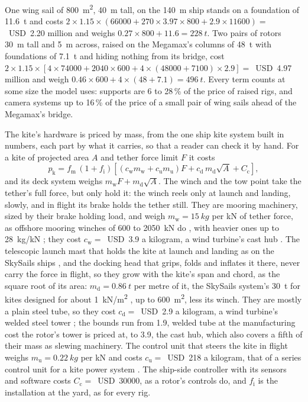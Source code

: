 One wing sail of \SI{800}{m^2}, \SI{40}{m} tall, on the \SI{140}{m} ship stands on a foundation of \SI{11.6}{t} and costs $2\times1.15\times(\num{66000} + 270\times3.97\times800 + 2.9\times\num{11600}) =$~USD~2.20 million and weighs $0.27\times800 + 11.6=\SI{228}{t}$. Two pairs of rotors \SI{30}{m} tall and \SI{5}{m} across, raised on the Megamax's columns of \SI{48}{t} with foundations of \SI{7.1}{t} and hiding nothing from its bridge, cost $2\times1.15\times[4\times\num{74000} + 2040\times600 + 4\times(\num{48000} + \num{7100})\times2.9] =$~USD~4.97 million and weigh $0.46\times600 + 4\times(48 + 7.1) = \SI{496}{t}$. Every term counts at some size the model uses: supports are 6 to 28\,\% of the price of raised rigs, and camera systems up to 16\,\% of the price of a small pair of wing sails ahead of the Megamax's bridge.

The kite's hardware is priced by mass, from the one ship kite system built in numbers, each part by what it carries, so that a reader can check it by hand. For a kite of projected area $A$ and tether force limit $F$ it costs
\begin{equation}
p_\mathrm{k} = f_\mathrm{m}\,(1+f_\mathrm{i})\left[\left(c_\mathrm{w} m_\mathrm{w} + c_\mathrm{u} m_\mathrm{u}\right)F + c_\mathrm{d}\, m_\mathrm{d}\sqrt{A} + C_\mathrm{c}\right],
\label{eq:kite_price}
\end{equation}
and its deck system weighs $m_\mathrm{w}F + m_\mathrm{d}\sqrt{A}$. The winch and the tow point take the tether's full force, but only hold it: the winch reels only at launch and landing, slowly, and in flight its brake holds the tether still. They are mooring machinery, sized by their brake holding load, and weigh $m_\mathrm{w}=\SI{15}{kg}$ per kN of tether force, as offshore mooring winches of 600 to \SI{2050}{kN} do \citep{broehl2018offshore}, with heavier ones up to \SI{28}{kg/kN} \citep{mordec_deck}; they cost $c_\mathrm{w}=$~USD~3.9 a kilogram, a wind turbine's cast hub \citep{wisdem_csm}. The telescopic launch mast that holds the kite at launch and landing as on the SkySails ships \citep{wrage2018}, and the docking head that grips, folds and inflates it there, never carry the force in flight, so they grow with the kite's span and chord, as the square root of its area: $m_\mathrm{d}=\SI{0.86}{t}$ per metre of it, the SkySails system's \SI{30}{t} \citep[Annex A.4]{cedelft2016} for kites designed for about \SI{1}{kN/m^2} \citep{paulig2013}, up to \SI{600}{m^2}, less its winch. They are mostly a plain steel tube, so they cost $c_\mathrm{d}=$~USD~2.9 a kilogram, a wind turbine's welded steel tower \citep{wisdem_csm}; the bounds run from 1.9, welded tube at the manufacturing cost the rotor's tower is priced at, to 3.9, the cast hub, which also covers a fifth of their mass as slewing machinery. The control unit that steers the kite in flight weighs $m_\mathrm{u}=\SI{0.22}{kg}$ per kN \citep{paulig2013} and costs $c_\mathrm{u}=$~USD~218 a kilogram, that of a series control unit for a kite power system \citep{faggiani2018}. The ship-side controller with its sensors and software costs $C_\mathrm{c}=$~USD~\num{30000}, as a rotor's controls do, and $f_\mathrm{i}$ is the installation at the yard, as for every rig.

